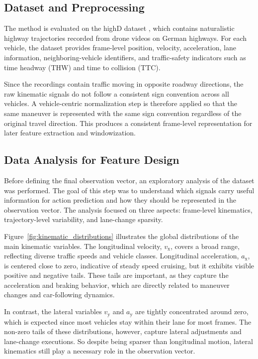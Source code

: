\documentclass[upint,subscriptcorrection,varvw,hyphenate,balance,greek,russian,vietnamese,german]{asmeconf} %
\begin{document}
\subsection{Dataset and Preprocessing}
The method is evaluated on the highD dataset \cite{krajewski2018highddatasetdronedataset}, which contains naturalistic highway trajectories recorded 
from drone videos on German highways. 
For each vehicle, the dataset provides frame-level position, velocity, acceleration, lane information, neighboring-vehicle identifiers, and traffic-safety indicators 
such as time headway (THW) and time to collision (TTC).

Since the recordings contain traffic moving in opposite roadway directions, the raw kinematic signals do not follow a consistent sign convention across all vehicles. 
A vehicle-centric normalization step is therefore applied so that the same maneuver is represented with the same sign convention regardless of the original travel direction. 
This produces a consistent frame-level representation for later feature extraction and windowization. 

\subsection{Data Analysis for Feature Design}
Before defining the final observation vector, an exploratory analysis of 
the dataset was performed. The goal of this step was to understand 
which signals carry useful information for action prediction and how they should be represented in the observation vector. 
The analysis focused on three aspects: frame-level kinematics, trajectory-level variability, and lane-change sparsity.

Figure~\ref{fig:kinematic_distributions} illustrates the global distributions of the main kinematic variables. 
The longitudinal velocity, $v_\mathrm{x}$, covers a broad range, reflecting diverse traffic speeds and vehicle classes. 
Longitudinal acceleration, $a_\mathrm{x}$, is centered close to zero, indicative of steady speed cruising, but it exhibits visible positive and negative tails. 
These tails are important, as they capture the acceleration and braking behavior, which are directly related to maneuver changes and car-following dynamics.

In contrast, the lateral variables $v_\mathrm{y}$ and $a_\mathrm{y}$ are tightly concentrated around zero, 
which is expected since most vehicles stay within their lane for most frames. 
The non-zero tails of these distributions, however, capture lateral adjustments and lane-change executions. 
So despite being sparser than longitudinal motion, lateral kinematics still play a necessary role in the observation vector.
\end{document}

